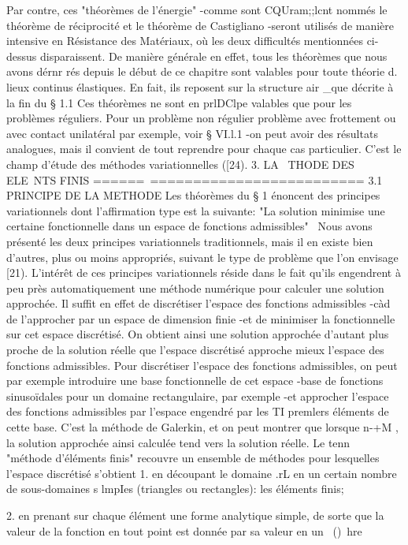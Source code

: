 {Par contre, ces "théorèmes de l'énergie" -comme sont CQUram;;lcnt nommés le théorème de réciprocité et le théorème de Castigliano -seront utilisés de manière intensive en Résistance des Matériaux, où les deux dif­ficultés mentionnées ci-dessus disparaissent. De manière générale en effet, tous les théorèmes que nous avons dérnr rés depuis le début de ce chapitre 
sont valables pour toute théorie d. lieux continus élastiques. En fait, 
ils reposent sur la structure air _que décrite à la fin du § 1.1 
Ces théorèmes ne sont en prlDClpe valables que pour les problèmes réguliers. Pour un problème non régulier problème avec frottement ou avec contact unilatéral par exemple, voir § VI.l.1 -on peut avoir des résultats analogues, mais il convient de tout reprendre pour chaque cas particulier. C'est le champ d'étude des méthodes variationnelles ([24). 
3. LA ~THODE DES ELE~NTS FINIS 
======~========================= 
3.1 PRINCIPE DE LA METHODE 
Les théorèmes du § 1 énoncent des principes variationnels dont l'affirmation type est la suivante: "La solution minimise une certaine fonc­tionnelle dans un espace de fonctions admissibles"~ Nous avons présenté les deux principes variationnels traditionnels, mais il en existe bien d'autres, plus ou moins appropriés, suivant le type de problème que l'on envisage [21). L'intérêt de ces principes variationnels réside dans le fait qu'ils engen­drent à peu près automatiquement une méthode numérique pour calculer une so­lution approchée. Il suffit en effet de discrétiser l'espace des fonctions admissibles -càd de l'approcher par un espace de dimension finie -et de 
minimiser la fonctionnelle sur cet espace discrétisé. On obtient ainsi une 
solution approchée d'autant plus proche de la solution réelle que l'espace discrétisé approche mieux l'espace des fonctions admissibles. 
Pour discrétiser l'espace des fonctions admissibles, on peut par exemple introduire une base fonctionnelle de cet espace -base de fonctions sinusoïdales pour un domaine rectangulaire, par exemple -et approcher l'es­pace des fonctions admissibles par l'espace engendré par les TI premlers éléments de cette base. C'est la méthode de Galerkin, et on peut montrer que lorsque n-+M , la solution approchée ainsi calculée tend vers la solution réelle. 
Le tenn~ "méthode d'éléments finis" recouvre un ensemble de métho­des pour lesquelles l'espace discrétisé s'obtient 
1. 
en découpant le domaine .rL en un certain nombre de sous-domaines s lm­pIes (triangles ou rectangles): les éléments finis; 

2. 
en prenant sur chaque élément une forme analytique simple, de sorte que la valeur de la fonction en tout point est donnée par sa valeur en un ~()~hre 


}
